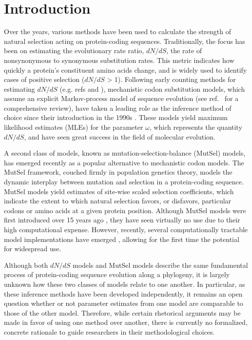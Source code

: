 \documentclass[11pt]{article}
\begin{document}
\section*{Introduction}

Over the years, various methods have been used to calculate the strength of natural selection acting on protein-coding sequences. Traditionally, the focus has been on estimating the evolutionary rate ratio, $dN/dS$, the rate of nonsynonymous to synonymous substitution rates. This metric indicates how quickly a protein's constituent amino acids change, and is widely used to identify cases of positive selection ($dN/dS$ > 1). Following early counting methods for estimating $dN/dS$ (e.g. refs \cite{LWL85} and \cite{NG86}), mechanistic codon substitution models, which assume an explicit Markov-process model of sequence evolution (see ref.~\cite{Anisimova2009} for a comprehensive review), have taken a leading role as the inference method of choice since their introduction in the 1990s \cite{GoldmanYang1994, MuseGaut1994}. These models yield maximum likelihood estimates (MLEs) for the parameter $\omega$, which represents the quantity $dN/dS$, and have seen great success in the field of molecular evolution. 

A second class of models, known as mutation-selection-balance (MutSel) models, has emerged recently as a popular alternative to mechanistic codon models. The MutSel framework, couched firmly in population genetics theory, models the dynamic interplay between mutation and selection in a protein-coding sequence. MutSel models yield estimates of site-wise scaled selection coefficients, which indicate the extent to which natural selection favors, or disfavors, particular codons or amino acids at a given protein position. Although MutSel models were first introduced over 15 years ago \cite{HalpernBruno1998}, they have seen virtually no use due to their high computational expense. However, recently, several computationally tractable model implementations have emerged \cite{RodrigueLartillot2014,Tamurietal2014}, allowing for the first time the potential for widespread use. 

Although both $dN/dS$ models and MutSel models describe the same fundamental process of protein-coding sequence evolution along a phylogeny, it is largely unknown how these two classes of models relate to one another. In particular, as these inference methods have been developed independently, it remains an open question whether or not parameter estimates from one model are comparable to those of the other model. Therefore, while certain rhetorical arguments may be made in favor of using one method over another, there is currently no formalized, concrete rationale to guide researchers in their methodological choices. 
\end{document}
